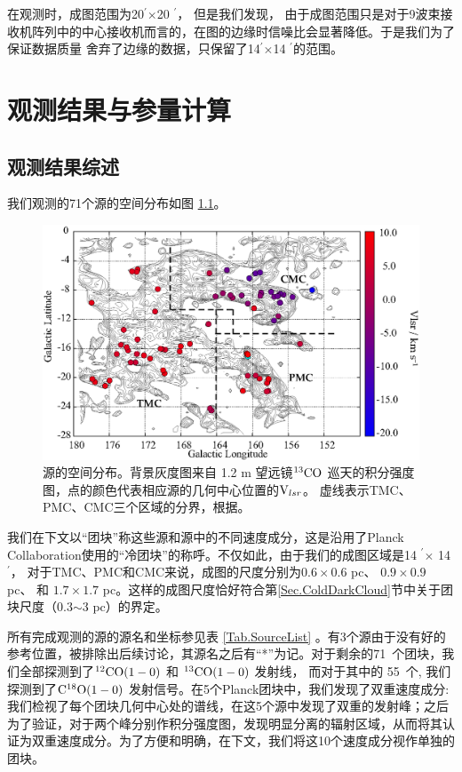 \documentclass[UTF8, nocolorlinks]{pkuthss}
\newcommand{\cob}{$\rm ^{13}CO$ }
\newcommand{\coaa}{$\rm^{12}CO(1-0)$ }
\newcommand{\cobb}{$\rm^{13}CO(1-0)$ }
\newcommand{\cocc}{$\rm C^{18}O(1-0)$ }
\newcommand{\multi}{$\times$}
\newcommand{\vlsr}{${\rm V } _{lsr}$}
\newcommand{\arcmin}{$^{\prime}$}
\newcommand{\numsou}{71\ }
\newcommand{\numcocc}{55\ }
\begin{document}
        在观测时，成图范围为20\arcmin \multi 20 \arcmin ， 但是我们发现， 由于成图范围只是对于9波束接收机阵列中的中心接收机而言的，在图的边缘时信噪比会显著降低。于是我们为了保证数据质量 舍弃了边缘的数据，只保留了14\arcmin \multi 14 \arcmin 的范围。

\chapter{观测结果与参量计算}

	\section{观测结果综述}
		我们观测的71个源的空间分布如图 \ref{Fig.SpatialDistribution}。

		\begin{figure}[H]
		\centering
		\includegraphics[totalheight=72mm]{img_plot/SpatiaDist_Velocity_Overlay.eps}
		\caption{\small 源的空间分布。背景灰度图来自 1.2 m 望远镜\cob 巡天的积分强度图\supercite{2001ApJ...547..792D}，点的颜色代表相应源的几何中心位置的\vlsr 。
		虚线表示TMC、PMC、CMC三个区域的分界，根据\parencite{2010A&A...512A..67L}。
		\label{Fig.SpatialDistribution}}
		\end{figure}

		我们在下文以“团块”称这些源和源中的不同速度成分，这是沿用了Planck Collaboration使用的“冷团块”的称呼\supercite{2011A&A...536A..23P}。不仅如此，由于我们的成图区域是14 \arcmin $\times$ 14 \arcmin ， 对于TMC、PMC和CMC来说，成图的尺度分别为$0.6\times0.6$ pc、 $0.9\times0.9$ pc、 和 $1.7\times1.7$ pc。这样的成图尺度恰好符合第\ref{Sec.ColdDarkCloud}节中关于团块尺度（0.3$\sim$3 pc）的界定。

		所有完成观测的源的源名和坐标参见表 \ref{Tab.SourceList} 。有3个源由于没有好的参考位置，被排除出后续讨论，其源名之后有“*”为记。对于剩余的\numsou 个团块，我们全部探测到了\coaa  和 \cobb 发射线， 而对于其中的 \numcocc 个, 我们探测到了\cocc 发射信号。在5个Planck团块中，我们发现了双重速度成分: 我们检视了每个团块几何中心处的谱线，在这5个源中发现了双重的发射峰；之后为了验证，对于两个峰分别作积分强度图，发现明显分离的辐射区域，从而将其认证为双重速度成分。为了方便和明确，在下文，我们将这10个速度成分视作单独的团块。
		
\end{document}
